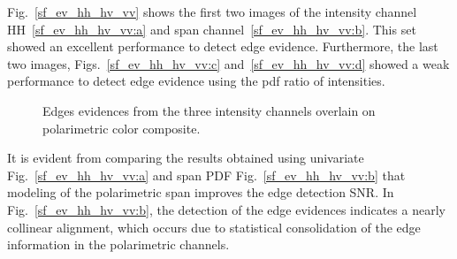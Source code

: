 \documentclass[remotesensing,article,submit,pdftex,moreauthors]{Definitions/mdpi}
\begin{document}
Fig.~\eqref{sf_ev_hh_hv_vv} shows the first two images of the intensity channel HH~\eqref{sf_ev_hh_hv_vv:a} and span channel~\eqref{sf_ev_hh_hv_vv:b}. This set showed an excellent performance to detect edge evidence. Furthermore, the last two images, Figs.~\eqref{sf_ev_hh_hv_vv:c} and~\eqref{sf_ev_hh_hv_vv:d} showed a weak performance to detect edge evidence using the pdf ratio of intensities. 
  \begin{figure}[hbt]
	\centering
     \caption{Edges evidences from the three intensity channels overlain on polarimetric color composite.}
     \label{sf_ev_hh_hv_vv} 
   \end{figure}

It is evident from comparing the results obtained using univariate Fig.~\eqref{sf_ev_hh_hv_vv:a} and span PDF Fig.~\eqref{sf_ev_hh_hv_vv:b} that modeling of the polarimetric span improves the edge detection SNR. In Fig.~\eqref{sf_ev_hh_hv_vv:b}, the detection of the edge evidences indicates a nearly collinear alignment, which occurs due to statistical consolidation of the edge information in the polarimetric channels.
\end{document}
